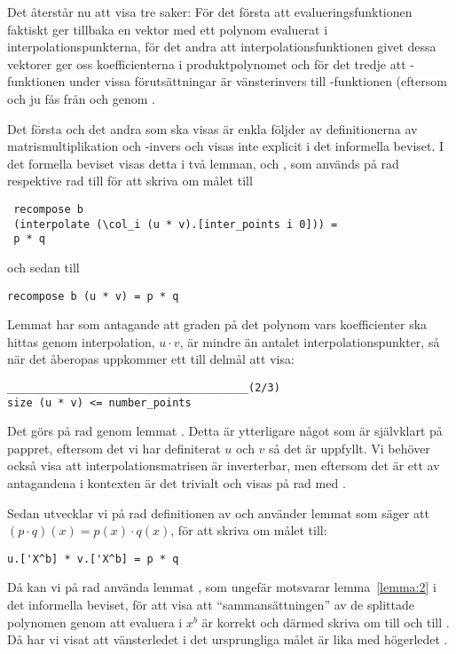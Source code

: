 Det återstår nu att visa tre saker: För det första att evalueringsfunktionen
 faktiskt ger tillbaka en vektor med ett polynom evaluerat i
interpolationspunkterna, för det andra att interpolationsfunktionen
 givet dessa vektorer ger oss koefficienterna i produktpolynomet
 och för det tredje att \C{recompose]}-funktionen under vissa
förutsättningar är vänsterinvers till -funktionen (eftersom  och
 ju fås från  och  genom .

Det första och det andra som ska visas är enkla följder av definitionerna av
matrismultiplikation och -invers och visas inte explicit i det informella
beviset. I det formella beviset visas detta i två lemman, 
och , som används på rad  respektive rad 
till  för att skriva om målet till
\begin{lstlisting}
 recompose b
 (interpolate (\col_i (u * v).[inter_points i 0])) =
 p * q
\end{lstlisting}
och sedan till
\begin{lstlisting}
recompose b (u * v) = p * q
\end{lstlisting}
Lemmat  har som antagande att graden på det polynom vars
koefficienter ska hittas genom interpolation, $u \cdot v$, är mindre än antalet
interpolationspunkter, så när det åberopas uppkommer ett till delmål att visa:
\begin{lstlisting}
______________________________________(2/3)
size (u * v) <= number_points
\end{lstlisting}
Det görs på rad  genom lemmat . Detta är ytterligare
något som är självklart på pappret, eftersom det vi har definiterat $u$ och $v$
så det är uppfyllt. Vi behöver också visa att interpolationsmatrisen  är
inverterbar, men eftersom det är ett av antagandena i kontexten är det trivialt
och visas på rad  med \C{//}.

Sedan utvecklar vi på rad  definitionen av  och använder
lemmat  som säger att $(p \cdot q)(x) = p(x) \cdot q(x)$, för att
skriva om målet till:
\begin{lstlisting}
u.['X^b] * v.['X^b] = p * q
\end{lstlisting}
Då kan vi på rad  använda lemmat , som ungefär
motsvarar lemma~\ref{lemma:2} i det informella beviset, för att visa att
``sammansättningen'' av de splittade polynomen genom att evaluera i $x^b$ är
korrekt och därmed skriva om  till  och  till
. Då har vi visat att vänsterledet i det ursprungliga målet är lika med
högerledet .

